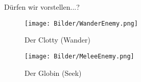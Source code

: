 \begin{frame}{Dürfen wir vorstellen...?}
\begin{figure}

  \centering
  
  \begin{minipage}[b]{0.35\textwidth}
    \texttt{[image: Bilder/WanderEnemy.png]}
    \caption{Der Clotty (Wander)}
  \end{minipage}
  \hfill
  \begin{minipage}[b]{0.35\textwidth}
    \texttt{[image: Bilder/MeleeEnemy.png]}
    \caption{Der Globin (Seek)}
  \end{minipage}
    
\end{figure}
\end{frame}